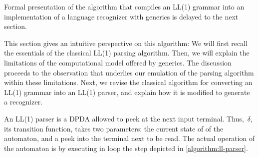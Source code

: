 Formal presentation of the algorithm that compiles an LL(1) grammar into an implementation of a
  language recognizer with \Java generics
  is delayed to the next section.

This section gives an intuitive perspective on this algorithm:
We will first recall the essentials of the classical LL(1) parsing algorithm.
Then, we will explain the limitations of the computational model
  offered by \Java generics.
The discussion proceeds to the observation
  that underlies our emulation of the parsing algorithm
  within these limitations.
Next, we revise the classical algorithm for converting
  an LL(1) grammar into an LL(1) parser, and explain
  how it is modified to generate a recognizer.

An LL(1) parser is a DPDA allowed to peek at the next input terminal.
Thus,~$δ$, its transition function, takes two parameters: the current state of
of the automaton, and a peek into the terminal next to be read.
The actual operation of the automaton
  is by executing in loop the step
    depicted in \cref{algorithm:ll-parser}.


